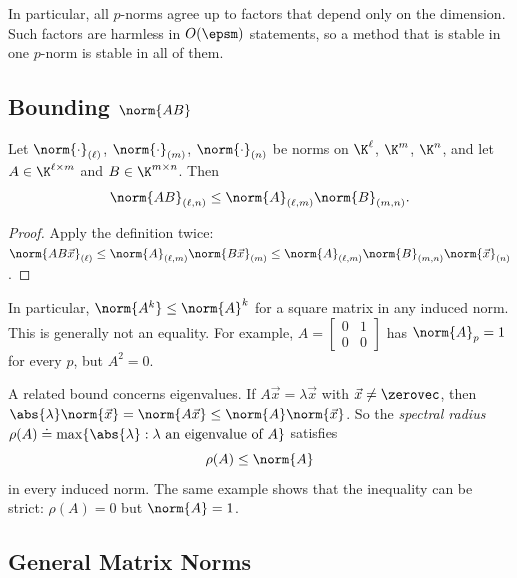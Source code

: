 In particular, all $p$-norms agree up to factors that depend only on the dimension. Such factors are harmless in $O(\epsm)$ statements, so a method that is stable in one $p$-norm is stable in all of them.

\subsection{Bounding $\norm{AB}$}

\begin{proposition}
  \label{prop:submult}
  Let $\norm{\cdot}_{(\ell)}$, $\norm{\cdot}_{(m)}$, $\norm{\cdot}_{(n)}$ be norms on $\K^\ell$, $\K^m$, $\K^n$, and let $A \in \K^{\ell \times m}$ and $B \in \K^{m \times n}$. Then
  \begin{equation}
    \norm{AB}_{(\ell,n)} \le \norm{A}_{(\ell,m)}\norm{B}_{(m,n)}.
  \end{equation}
\end{proposition}

\begin{proof}
  Apply the definition twice: $\norm{AB\vec{x}}_{(\ell)} \le \norm{A}_{(\ell,m)}\norm{B\vec{x}}_{(m)} \le \norm{A}_{(\ell,m)}\norm{B}_{(m,n)}\norm{\vec{x}}_{(n)}$.
\end{proof}

In particular, $\norm{A^k} \le \norm{A}^k$ for a square matrix in any induced norm. This is generally not an equality. For example, $A = \left[\begin{smallmatrix} 0 & 1 \\ 0 & 0 \end{smallmatrix}\right]$ has $\norm{A}_p = 1$ for every $p$, but $A^2 = 0$.

A related bound concerns eigenvalues. If $A\vec{x} = \lambda\vec{x}$ with $\vec{x} \ne \zerovec$, then $\abs{\lambda}\norm{\vec{x}} = \norm{A\vec{x}} \le \norm{A}\norm{\vec{x}}$. So the \emph{spectral radius} $\rho(A) \doteq \max\{\abs{\lambda} : \lambda \text{ an eigenvalue of } A\}$ satisfies
\begin{equation}
  \rho(A) \le \norm{A}
\end{equation}
in every induced norm. The same example shows that the inequality can be strict: $\rho(A) = 0$ but $\norm{A} = 1$.

\subsection{General Matrix Norms}


